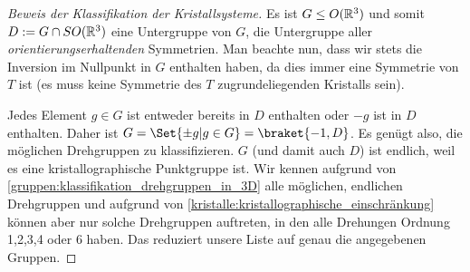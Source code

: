 \begin{proof}[Beweis der Klassifikation der Kristallsysteme]
Es ist $G\leq O(\mathbb{R}^3)$ und somit $D:=G\cap SO(\mathbb{R}^3)$ eine Untergruppe von $G$, die Untergruppe aller \emph{orientierungserhaltenden} Symmetrien. Man beachte nun, dass wir stets die Inversion im Nullpunkt in $G$ enthalten haben, da dies immer eine Symmetrie von $T$ ist (es muss keine Symmetrie des $T$ zugrundeliegenden Kristalls sein).

Jedes Element $g\in G$ ist entweder bereits in $D$ enthalten oder $-g$ ist in $D$ enthalten. Daher ist $G=\Set{\pm g | g\in G} = \braket{-1,D}$. Es genügt also, die möglichen Drehgruppen zu klassifizieren. $G$ (und damit auch $D$) ist endlich, weil es eine kristallographische Punktgruppe ist. Wir kennen aufgrund von \ref{gruppen:klassifikation_drehgruppen_in_3D} alle möglichen, endlichen Drehgruppen und aufgrund von \ref{kristalle:kristallographische_einschränkung} können aber nur solche Drehgruppen auftreten, in den alle Drehungen Ordnung 1,2,3,4 oder 6 haben. Das reduziert unsere Liste auf genau die angegebenen Gruppen.
\end{proof}